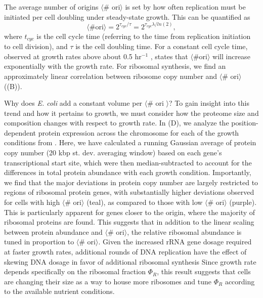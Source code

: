 The average number of origins $\langle$\# ori$\rangle$ is set by how often
replication must be initiated per cell doubling under steady-state growth.
This can be quantified as
\begin{equation}
    \langle \text{\# ori} \rangle = 2^{\tau_{cyc} / \tau} = 2^{\tau_{cyc} \lambda / ln(2)},
    \label{eq:Nori}
\end{equation}
where $t_{cyc}$ is the cell cycle time (referring to the time from replication
initiation to cell division), and $\tau$ is the cell doubling time. For a
constant cell cycle time, observed at growth rates above about 0.5 hr$^{-1}$
\citep{helmstetter1968},  states that $\langle \text{\# ori} \rangle$ will increase
exponentially with the growth rate.
For ribosomal synthesis, we find an approximately
linear correlation between ribosome copy number and $\langle$\# ori$\rangle$
((B)).

Why does \textit{E. coli} add a constant volume per $\langle$\# ori $\rangle$?
To gain insight into this trend and how it pertains to growth, we must consider
how the proteome size and composition changes with respect to growth rate. In
(D), we analyze the position-dependent protein
expression across the chromosome for each of the growth conditions from
\cite{schmidt2016}. Here, we have calculated a running Gaussian average of
protein copy number (20 kbp st. dev. averaging window) based on each gene's
transcriptional start site, which were then median-subtracted to account for the
differences in total protein abundance with each growth condition. Importantly,
we find that the major deviations in protein copy number are largely restricted
to regions of ribosomal protein genes, with substantially higher deviations
observed for cells with high $\langle$\# ori$\rangle$ (teal), as compared to
those with low $\langle$\# ori$\rangle$ (purple). This is particularly apparent
for genes closer to the origin, where the majority of ribosomal proteins are
found. This suggests that in addition to the linear scaling between protein
abundance and $\langle$\# ori$\rangle$, the relative ribosomal abundance is
tuned in proportion to $\langle$\# ori$\rangle$.  Given the increased rRNA gene
dosage required at faster growth rates, additional rounds of DNA replication
have the effect of skewing DNA dosage in favor of additional ribosomal synthesis
Since growth rate depends specifically on the ribosomal fraction $\Phi_R$, this
result suggests that cells are changing their size as a way to house more
ribosomes and tune $\Phi_R$ according to the available nutrient conditions.



